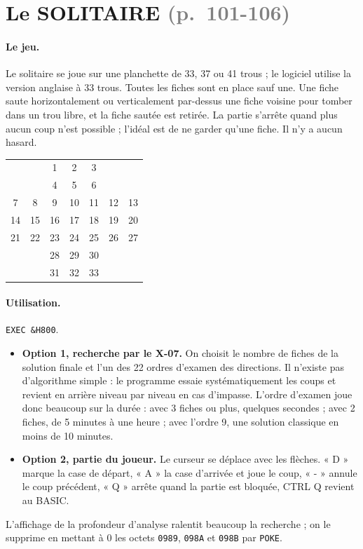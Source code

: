 \documentclass[a4paper,10pt]{article}
\newcommand{\hex}[1]{\texttt{#1}}
\newcommand{\pg}[1]{\texorpdfstring{\textcolor{gray}{\small(p.~#1)}}{}}
\begin{document}
\section{Le SOLITAIRE \pg{101-106}}

\paragraph{Le jeu.} Le solitaire se joue sur une planchette de 33, 37 ou 41
trous ; le logiciel utilise la version anglaise à 33 trous. Toutes les
fiches sont en place sauf une. Une fiche saute horizontalement ou
verticalement par-dessus une fiche voisine pour tomber dans un trou libre,
et la fiche sautée est retirée. La partie s'arrête quand plus aucun coup
n'est possible ; l'idéal est de ne garder qu'une fiche. Il n'y a aucun
hasard.

\begin{center}\small\ttfamily
\begin{tabular}{@{}*{7}{c}@{}}
   &    &  1 &  2 &  3 &    &    \\
   &    &  4 &  5 &  6 &    &    \\
 7 &  8 &  9 & 10 & 11 & 12 & 13 \\
14 & 15 & 16 & 17 & 18 & 19 & 20 \\
21 & 22 & 23 & 24 & 25 & 26 & 27 \\
   &    & 28 & 29 & 30 &    &    \\
   &    & 31 & 32 & 33 &    &    \\
\end{tabular}
\end{center}

\paragraph{Utilisation.} \texttt{EXEC \&H800}.
\begin{itemize}
  \item \textbf{Option 1, recherche par le X-07.} On choisit le nombre de
        fiches de la solution finale et l'un des 22 ordres d'examen des
        directions. Il n'existe pas d'algorithme simple : le programme
        essaie systématiquement les coups et revient en arrière niveau par
        niveau en cas d'impasse. L'ordre d'examen joue donc beaucoup sur la
        durée : avec 3 fiches ou plus, quelques secondes ; avec 2 fiches,
        de 5 minutes à une heure ; avec l'ordre 9, une solution classique
        en moins de 10 minutes.
  \item \textbf{Option 2, partie du joueur.} Le curseur se déplace avec les
        flèches. « D » marque la case de départ, « A » la case d'arrivée et
        joue le coup, « - » annule le coup précédent, « Q » arrête quand la
        partie est bloquée, CTRL Q revient au BASIC.
\end{itemize}
L'affichage de la profondeur d'analyse ralentit beaucoup la recherche ; on
le supprime en mettant à 0 les octets \hex{0989}, \hex{098A} et \hex{098B}
par \texttt{POKE}.
\end{document}
